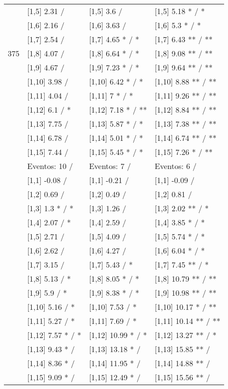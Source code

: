 \begin{table}
\begin{tabular}[t]{llll}
 & {}[1,5] 2.31  / & {}[1,5] 3.6  / & {}[1,5] 5.18 * / *\\
 & {}[1,6] 2.16  / & {}[1,6] 3.63  / & {}[1,6] 5.3 * / *\\
 & {}[1,7] 2.54  / & {}[1,7] 4.65 * / * & {}[1,7] 6.43 ** / **\\
375 & {}[1,8] 4.07  / & {}[1,8] 6.64 * / * & {}[1,8] 9.08 ** / **\\
\addlinespace
 & {}[1,9] 4.67  / & {}[1,9] 7.23 * / * & {}[1,9] 9.64 ** / **\\
 & {}[1,10] 3.98  / & {}[1,10] 6.42 * / * & {}[1,10] 8.88 ** / **\\
 & {}[1,11] 4.04  / & {}[1,11] 7 * / * & {}[1,11] 9.26 ** / **\\
 & {}[1,12] 6.1  / * & {}[1,12] 7.18 * / ** & {}[1,12] 8.84 ** / **\\
 & {}[1,13] 7.75  / & {}[1,13] 5.87 * / * & {}[1,13] 7.38 ** / **\\
\addlinespace
 & {}[1,14] 6.78  / & {}[1,14] 5.01 * / * & {}[1,14] 6.74 ** / **\\
 & {}[1,15] 7.44  / & {}[1,15] 5.45 * / * & {}[1,15] 7.26 * / **\\
 & Eventos:  10 / & Eventos:  7 / & Eventos:  6 /\\
 & {}[1,1] -0.08  / & {}[1,1] -0.21  / & {}[1,1] -0.09  /\\
 & {}[1,2] 0.69  / & {}[1,2] 0.49  / & {}[1,2] 0.81  /\\
\addlinespace
 & {}[1,3] 1.3 * / * & {}[1,3] 1.26  / & {}[1,3] 2.02 ** / *\\
 & {}[1,4] 2.07  / * & {}[1,4] 2.59  / & {}[1,4] 3.85 * / *\\
 & {}[1,5] 2.71  / & {}[1,5] 4.09  / & {}[1,5] 5.74 * / *\\
 & {}[1,6] 2.62  / & {}[1,6] 4.27  / & {}[1,6] 6.04 * / *\\
 & {}[1,7] 3.15  / & {}[1,7] 5.43  / * & {}[1,7] 7.45 ** / *\\
\addlinespace
500 & {}[1,8] 5.13  / * & {}[1,8] 8.05 * / * & {}[1,8] 10.79 ** / **\\
 & {}[1,9] 5.9  / * & {}[1,9] 8.38 * / * & {}[1,9] 10.98 ** / **\\
 & {}[1,10] 5.16  / * & {}[1,10] 7.53  / * & {}[1,10] 10.17 * / **\\
 & {}[1,11] 5.27  / * & {}[1,11] 7.69  / * & {}[1,11] 10.14 ** / **\\
 & {}[1,12] 7.57 * / * & {}[1,12] 10.99 * / * & {}[1,12] 13.27 ** / *\\
\addlinespace
 & {}[1,13] 9.43 * / & {}[1,13] 13.18 * / & {}[1,13] 15.85 ** /\\
 & {}[1,14] 8.36 * / & {}[1,14] 11.95 * / & {}[1,14] 14.88 ** /\\
 & {}[1,15] 9.09 * / & {}[1,15] 12.49 * / & {}[1,15] 15.56 ** /\\
\bottomrule
\end{tabular}
\end{table}
